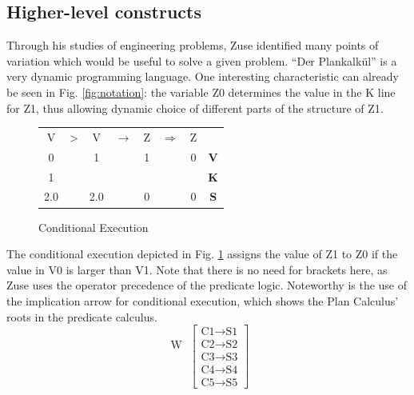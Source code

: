 \documentclass{llncs}
\begin{document}
 \subsection{Higher-level constructs}
   Through his studies of engineering problems, Zuse identified many points of variation 
   which would be useful to solve a given problem. ``Der Plankalkül'' is a very dynamic 
   programming language. One interesting characteristic can already be seen in Fig. \ref{fig:notation}: 
   the variable Z0 determines the value in the K line for Z1, thus allowing dynamic choice of 
   different parts of the structure of Z1\cite{zuse1948allgemeinen}.
   \begin{figure}[h!]
     \begin{center}
       \begin{tabular}[bt]{c c c c c c c | c}
	 V & > & V & $\rightarrow$ & Z & $\Rightarrow$ & Z & ~\\
	 0 &   & 1 &               & 1 &               & 0 & {\bf V}\\
	 1 &   &   &               &   &               &   & {\bf K}\\
	 2.0 & & 2.0 &             & 0 &               & 0 & {\bf S}\\
       \end{tabular}
     \end{center}
     \caption{Conditional Execution}
     \label{fig:ifthen}
   \end{figure}
   The conditional execution depicted in Fig. \ref{fig:ifthen} assigns the value of Z1 to Z0 if
   the value in V0 is larger than V1. Note that there is no need for brackets 
   here, as Zuse uses the operator precedence of the predicate logic. Noteworthy 
   is the use of the implication arrow for conditional execution, which shows 
   the Plan Calculus' roots in the predicate calculus.
   \begin{equation*}
     \begin{matrix} 
       \text{W}~\\~\\~\\~\\~\\
     \end{matrix}
     \left[ \begin{matrix}
       \text{C1}\rightarrow\text{S1}\\
       \text{C2}\rightarrow\text{S2}\\
       \text{C3}\rightarrow\text{S3}\\
       \text{C4}\rightarrow\text{S4}\\
       \text{C5}\rightarrow\text{S5}
     \end{matrix} \right]
     \label{eq:while}
   \end{equation*}
\end{document}
